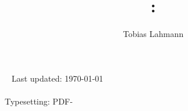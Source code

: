 \documentclass{diplom-mi-eng}
\author{Tobias Lahmann}
\title{\projectName: \projectSubline}
\begin{document}
\frontmatter %

\maketitle	%

\clearpage
\thispagestyle{empty}
{	\small\textsf
	\flushleft
	~\vfill
	Last updated: \today\\[1cm]
	\copyrightinfo\\[.5cm]	%
	Typesetting: PDF-\LaTeXe
}





\tableofcontents

\mainmatter %























\appendix		%


\backmatter %

\listoffigures	%
\listoftables	%

%


\cleardoublepage
\clearscrheadfoot
\end{document}
